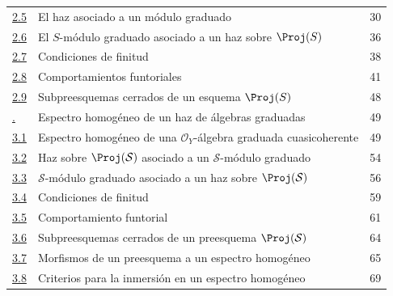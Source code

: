 \documentclass[oneside,10pt]{amsart}
\newcommand{\oldpage}[2][]{\marginnote{\normalfont\footnotesize\textbf{#1}~|~#2}\ignorespaces}
\begin{document}
\begin{longtable}{@{}p{}p{}r@{}}
\hyperref[subsection:II.2.5-fr]{2.5} & El haz asociado a un módulo graduado & 30\\
\hyperref[subsection:II.2.6-fr]{2.6} & El $S$-módulo graduado asociado a un haz sobre $\Proj(S)$ & 36\\
\hyperref[subsection:II.2.7-fr]{2.7} & Condiciones de finitud & 38\\
\hyperref[subsection:II.2.8-fr]{2.8} & Comportamientos funtoriales & 41\\
\hyperref[subsection:II.2.9-fr]{2.9} & Subpreesquemas cerrados de un esquema $\Proj(S)$ & 48\\
\hyperref[section:II.3-fr]{\textsection3.} & Espectro homogéneo de un haz de álgebras graduadas & 49\\
\hyperref[subsection:II.3.1-fr]{3.1} & Espectro homogéneo de una $\mathcal{O}_Y$-álgebra graduada cuasicoherente & 49\\
\hyperref[subsection:II.3.2-fr]{3.2} & Haz sobre $\Proj(\mathcal{S})$ asociado a un $\mathcal{S}$-módulo graduado & 54\\
\hyperref[subsection:II.3.3-fr]{3.3} & $\mathcal{S}$-módulo graduado asociado a un haz sobre $\Proj(\mathcal{S})$ & 56\\
\hyperref[subsection:II.3.4-fr]{3.4} & Condiciones de finitud & 59\\
\hyperref[subsection:II.3.5-fr]{3.5} & Comportamiento funtorial & 61\\
\hyperref[subsection:II.3.6-fr]{3.6} & Subpreesquemas cerrados de un preesquema $\Proj(\mathcal{S})$ & 64\\
\hyperref[subsection:II.3.7-fr]{3.7} & Morfismos de un preesquema a un espectro homogéneo & 65\\
\hyperref[subsection:II.3.8-fr]{3.8} & Criterios para la inmersión en un espectro homogéneo & 69\\
\end{longtable}
\oldpage[II]{214}
\end{document}
